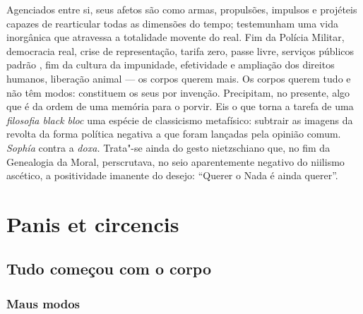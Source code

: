 Agenciados entre si, seus afetos são como armas, propulsões, impulsos e
projéteis capazes de rearticular todas as dimensões do tempo;
testemunham uma vida inorgânica que atravessa a totalidade movente do
real. Fim da Polícia Militar, democracia real, crise de representação,
tarifa zero, passe livre, serviços públicos padrão , fim da cultura
da impunidade, efetividade e ampliação dos direitos humanos, liberação
animal --- os corpos querem mais. Os corpos querem tudo e não têm modos:
constituem os seus por invenção. Precipitam, no presente, algo que é da
ordem de uma memória para o porvir. Eis o que torna a tarefa de uma
\emph{filosofia black bloc} uma espécie de classicismo metafísico:
subtrair as imagens da revolta da forma política negativa a que foram
lançadas pela opinião comum. \emph{Sophía} contra a \emph{doxa.}
Trata"-se ainda do gesto nietzschiano que, no fim da Genealogia da Moral,
perscrutava, no seio aparentemente negativo do niilismo ascético, a
positividade imanente do desejo: ``Querer o Nada é ainda querer''.

\chapter{Panis et circencis}


\section{Tudo começou com o corpo}

\subsection{Maus modos}

